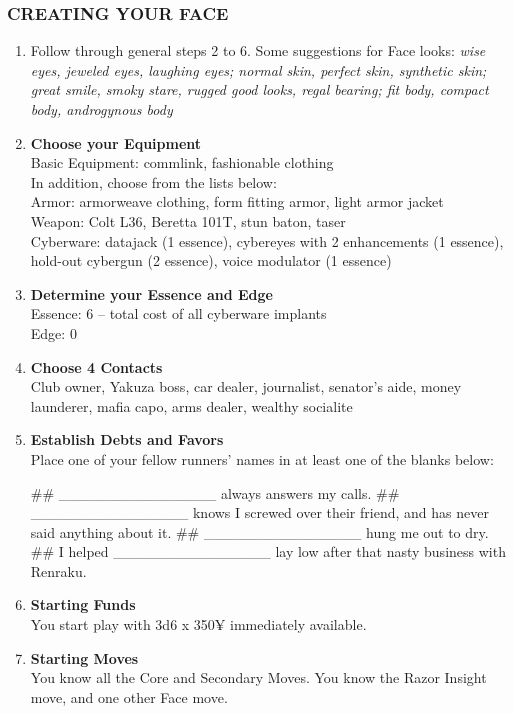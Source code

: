 \subsubsection{CREATING YOUR FACE}
\begin{enumerate}
    \item Follow through general steps 2 to 6. Some suggestions for Face looks: \textit{wise eyes, jeweled eyes, laughing eyes; normal skin, perfect skin, synthetic skin; great smile, smoky stare, rugged good looks, regal bearing; fit body, compact body, androgynous body}
    
    \item \textbf{Choose your Equipment} \\
    Basic Equipment: commlink, fashionable clothing \\
    In addition, choose from the lists below: \\
    Armor: armorweave clothing, form fitting armor, light armor jacket \\
    Weapon: Colt L36, Beretta 101T, stun baton, taser \\
    Cyberware: datajack (1 essence), cybereyes with 2 enhancements (1 essence), hold-out cybergun (2 essence), voice modulator (1 essence)
    
    \item \textbf{Determine your Essence and Edge} \\
    Essence: 6 – total cost of all cyberware implants \\
    Edge: 0
    
    \item \textbf{Choose 4 Contacts} \\
    Club owner, Yakuza boss, car dealer, journalist, senator’s aide, money launderer, mafia capo, arms dealer, wealthy socialite
    
    \item \textbf{Establish Debts and Favors} \\
    Place one of your fellow runners’ names in at least one of the blanks below:
        \begin{easylist}
            ## \_\_\_\_\_\_\_\_\_\_\_\_\_\_\_ always answers my calls.
            ## \_\_\_\_\_\_\_\_\_\_\_\_\_\_\_ knows I screwed over their friend, and has never said anything about it.
            ## \_\_\_\_\_\_\_\_\_\_\_\_\_\_\_ hung me out to dry.
            ## I helped \_\_\_\_\_\_\_\_\_\_\_\_\_\_\_ lay low after that nasty business with Renraku.
        \end{easylist}
    
    \item \textbf{Starting Funds} \\
    You start play with 3d6 x 350¥ immediately available.
    
    \item \textbf{Starting Moves} \\
    You know all the Core and Secondary Moves. You know the Razor Insight move, and one other Face move.
\end{enumerate}

